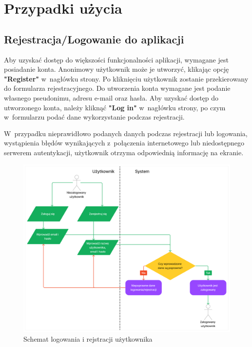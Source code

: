 \FloatBarrier

\section{Przypadki użycia}

\subsection{Rejestracja/Logowanie do aplikacji}

Aby uzyskać dostęp do większości funkcjonalności aplikacji, wymagane
jest posiadanie konta. Anonimowy użytkownik może je utworzyć, klikając
opcję \textbf{"Register"} w~nagłówku strony. Po kliknięciu użytkownik
zostanie przekierowany do formularza rejestracyjnego.
Do utworzenia konta wymagane jest podanie własnego
pseudonimu, adresu e-mail oraz hasła. Aby uzyskać dostęp do utworzonego
konta, należy kliknąć \textbf{"Log in"} w~nagłówku strony, po czym
w~formularzu podać dane wykorzystanie podczas rejestracji.

W~przypadku nieprawidłowo podanych danych podczas rejestracji
lub logowania, wystąpienia błędów wynikających z~połączenia internetowego lub
niedostępnego serwerem autentykacji, użytkownik otrzyma odpowiednią
informację na ekranie.

\begin{figure}[h]
  \centering
  \includegraphics[width=\textwidth]{img/schematy/login.png}
  \caption{Schemat logowania i rejstracji użytkownika}
\end{figure}

